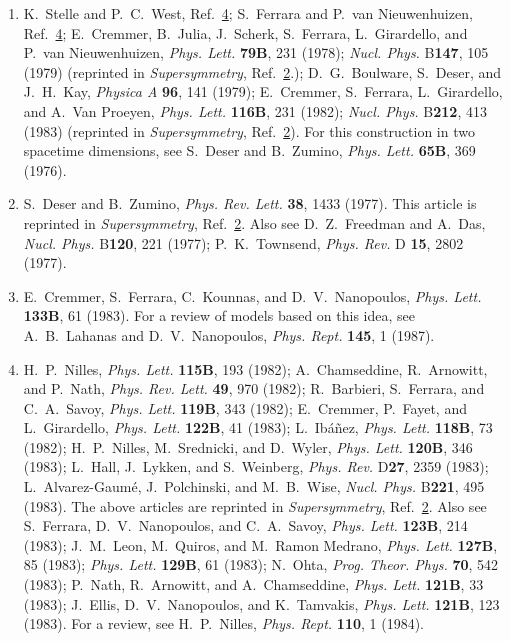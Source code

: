 \begin{enumerate}
  \item {}\label{ch31-ref-12}
  K.~Stelle and P.~C.~West, Ref.~\hyperref[ch31-ref-4]{4};
  S.~Ferrara and P.~van Nieuwenhuizen,
  Ref.~\hyperref[ch31-ref-4]{4}; E.~Cremmer, B.~Julia, J.~Scherk,
  S.~Ferrara, L.~Girardello, and P.~van Nieuwenhuizen,
  \textit{Phys. Lett.} \textbf{79B}, 231 (1978);
  \textit{Nucl. Phys.} B\textbf{147}, 105 (1979) (reprinted in
  \textit{Supersymmetry}, Ref.~\hyperref[ch31-ref-2]{2}.);
  D.~G.~Boulware, S.~Deser, and J.~H.~Kay, \textit{Physica A}
  \textbf{96}, 141 (1979); E.~Cremmer, S.~Ferrara, L.~Girardello,
  and A.~Van Proeyen, \textit{Phys. Lett.} \textbf{116B}, 231 (1982);
  \textit{Nucl. Phys.} B\textbf{212}, 413 (1983) (reprinted in
  \textit{Supersymmetry}, Ref.~\hyperref[ch31-ref-2]{2}). For this
  construction in two spacetime dimensions, see S.~Deser and
  B.~Zumino, \textit{Phys. Lett.} \textbf{65B}, 369 (1976).

  \item {}\label{ch31-ref-13}
  S.~Deser and B.~Zumino, \textit{Phys. Rev. Lett.} \textbf{38}, 1433
  (1977). This article is reprinted in \textit{Supersymmetry},
  Ref.~\hyperref[ch31-ref-2]{2}. Also see D.~Z.~Freedman and A.~Das,
  \textit{Nucl. Phys.} B\textbf{120}, 221 (1977); P.~K.~Townsend,
  \textit{Phys. Rev.} D \textbf{15}, 2802 (1977).

  \item[13a.] \label{ch31-ref-13a}
  E.~Cremmer, S.~Ferrara, C.~Kounnas, and D.~V.~Nanopoulos,
  \textit{Phys. Lett.} \textbf{133B}, 61 (1983). For a review of
  models based on this idea, see A.~B.~Lahanas and D.~V.~Nanopoulos,
  \textit{Phys. Rept.} \textbf{145}, 1 (1987).

  \item {}\label{ch31-ref-14}
  H.~P.~Nilles, \textit{Phys. Lett.} \textbf{115B}, 193 (1982);
  A.~Chamseddine, R.~Arnowitt, and P.~Nath,
  \textit{Phys. Rev. Lett.} \textbf{49}, 970 (1982); R.~Barbieri,
  S.~Ferrara, and C.~A.~Savoy, \textit{Phys. Lett.} \textbf{119B},
  343 (1982); E.~Cremmer, P.~Fayet, and L.~Girardello,
  \textit{Phys. Lett.} \textbf{122B}, 41 (1983); L.~Ib\'a\~nez,
  \textit{Phys. Lett.} \textbf{118B}, 73 (1982); H.~P.~Nilles,
  M.~Srednicki, and D.~Wyler, \textit{Phys. Lett.} \textbf{120B}, 346
  (1983); L.~Hall, J.~Lykken, and S.~Weinberg, \textit{Phys. Rev.}
  D\textbf{27}, 2359 (1983); L.~Alvarez-Gaum\'e, J.~Polchinski, and
  M.~B.~Wise, \textit{Nucl. Phys.} B\textbf{221}, 495 (1983). The
  above articles are reprinted in \textit{Supersymmetry},
  Ref.~\hyperref[ch31-ref-2]{2}. Also see S.~Ferrara,
  D.~V.~Nanopoulos, and C.~A.~Savoy, \textit{Phys. Lett.}
  \textbf{123B}, 214 (1983); J.~M.~Leon, M.~Quiros, and
  M.~Ramon Medrano, \textit{Phys. Lett.} \textbf{127B}, 85 (1983);
  \textit{Phys. Lett.} \textbf{129B}, 61 (1983); N.~Ohta,
  \textit{Prog. Theor. Phys.} \textbf{70}, 542 (1983); P.~Nath,
  R.~Arnowitt, and A.~Chamseddine, \textit{Phys. Lett.} \textbf{121B},
  33 (1983); J.~Ellis, D.~V.~Nanopoulos, and K.~Tamvakis,
  \textit{Phys. Lett.} \textbf{121B}, 123 (1983). For a review, see
  H.~P.~Nilles, \textit{Phys. Rept.} \textbf{110}, 1 (1984).


\end{enumerate}
